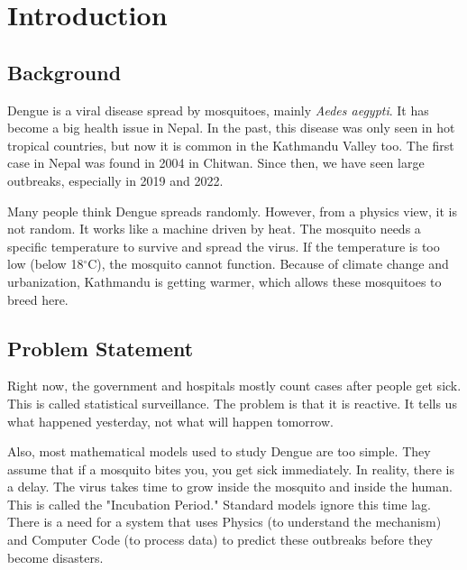 \documentclass[12pt, a4paper]{article}
\begin{document}
\newpage
\tableofcontents
\newpage
\listoffigures
\newpage

\section{Introduction}

\subsection{Background}
Dengue is a viral disease spread by mosquitoes, mainly \textit{Aedes aegypti}. It has become a big health issue in Nepal. In the past, this disease was only seen in hot tropical countries, but now it is common in the Kathmandu Valley too. The first case in Nepal was found in 2004 in Chitwan. Since then, we have seen large outbreaks, especially in 2019 and 2022.

Many people think Dengue spreads randomly. However, from a physics view, it is not random. It works like a machine driven by heat. The mosquito needs a specific temperature to survive and spread the virus. If the temperature is too low (below 18$^{\circ}$C), the mosquito cannot function. Because of climate change and urbanization, Kathmandu is getting warmer, which allows these mosquitoes to breed here.

\subsection{Problem Statement}
Right now, the government and hospitals mostly count cases after people get sick. This is called statistical surveillance. The problem is that it is reactive. It tells us what happened yesterday, not what will happen tomorrow.

Also, most mathematical models used to study Dengue are too simple. They assume that if a mosquito bites you, you get sick immediately. In reality, there is a delay. The virus takes time to grow inside the mosquito and inside the human. This is called the "Incubation Period." Standard models ignore this time lag. There is a need for a system that uses Physics (to understand the mechanism) and Computer Code (to process data) to predict these outbreaks before they become disasters.
\end{document}
